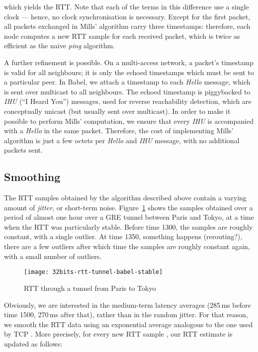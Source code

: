 \documentclass[conference,letterpaper]{IEEEtran}
\begin{document}
which yields the RTT.  Note that each of the terms in this difference
use a single clock --- hence, no clock synchronisation is necessary.
Except for the first packet, all packets exchanged in Mills' algorithm
carry three timestamps: therefore, each node computes a new RTT sample
for each received packet, which is twice as efficient as the naive
\emph{ping} algorithm.

A further refinement is possible.  On a multi-access network,
a packet's timestamp is valid for all neighbours; it is only the
echoed timestamps which must be sent to a particular peer.  In Babel,
we attach a timestamp to each \emph{Hello} message, which is sent over
multicast to all neighbours.  The echoed timestamp is piggybacked to
\emph{IHU} (``I Heard You'') messages, used for reverse reachability
detection, which are conceptually unicast (but usually sent over
multicast).  In order to make it possible to perform Mills'
computation, we ensure that every \emph{IHU} is accompanied with
a \emph{Hello} in the same packet.  Therefore, the cost of
implementing Mills' algorithm is just a few octets per \emph{Hello}
and \emph{IHU} message, with no additional packets sent.

\subsection{Smoothing}

The RTT samples obtained by the algorithm described above contain
a varying amount of \emph{jitter}, or short-term noise.
Figure~\ref{fig:rtt-paris-tokyo} shows the samples obtained over
a period of almost one hour over a GRE tunnel between Paris and Tokyo,
at a time when the RTT was particularly stable.  Before time 1300, the
samples are roughly constant, with a single outlier.  At time 1350,
something happens (rerouting?), there are a few outliers after which
time the samples are roughly constant again, with a small number of
outliers.

\begin{figure}[htb]
\centering
\texttt{[image: 32bits-rtt-tunnel-babel-stable]}
\caption{RTT through a tunnel from Paris to
  Tokyo}\label{fig:rtt-paris-tokyo}
\end{figure}

Obviously, we are interested in the medium-term latency averages
(285\,ms before time 1500, 270\,ms after that), rather than in the
random jitter.  For that reason, we smooth the RTT data using an
exponential average analogous to the one used by TCP \cite{rfc793}.
More precisely, for every new RTT sample , our RTT
estimate  is updated as follows:
\end{document}

